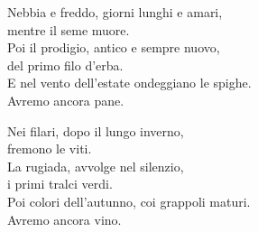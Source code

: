 
\strofa Nebbia e freddo, giorni lunghi e amari,\\
mentre il seme muore.\\
Poi il prodigio, antico e sempre nuovo,\\
del primo filo d'erba.\\
E nel vento dell'estate ondeggiano le spighe.\\
Avremo ancora pane.

\spazio


\spazio

\strofa Nei filari, dopo il lungo inverno,\\
fremono le viti.\\
La rugiada, avvolge nel silenzio,\\
i primi tralci verdi.\\
Poi colori dell'autunno, coi grappoli maturi.\\
Avremo ancora vino.

\spazio

